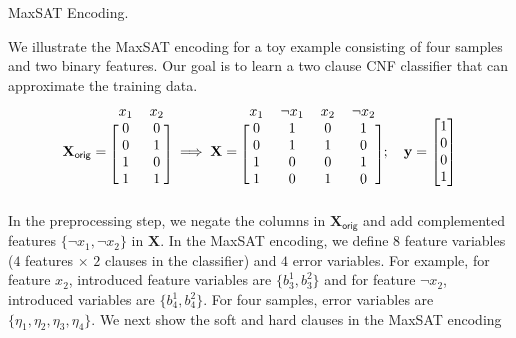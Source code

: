 \begin{example}{MaxSAT Encoding.}
\normalfont

We illustrate the MaxSAT encoding for a toy example consisting of four samples and two binary features. Our goal is to learn a two clause CNF classifier that can approximate the training data. 
\[ 
\mathbf{X}_\mathsf{orig} = 
\begin{blockarray}{cc}
x_1 & x_2 \\
\begin{block}{[cc]}
0 & 0 \\
0 & 1 \\
1 & 0 \\
1 & 1 \\
\end{block}
\end{blockarray} \implies 
\mathbf{X} = 
\begin{blockarray}{cccc}
x_1 & \neg x_1 & x_2  & \neg x_2\\
\begin{block}{[cccc]}
0 & 1 & 0 & 1\\
0 & 1 & 1 & 0\\
1 & 0 & 0 & 1\\
1 & 0 & 1 & 0\\
\end{block}
\end{blockarray}; \quad 
\mathbf{y} = 
\begin{bmatrix} 
1 \\ 0 \\ 0 \\ 1
\end{bmatrix}
\]
In the preprocessing step, we negate the columns in $ \mathbf{X}_\mathsf{orig} $ and add complemented features $ \{\neg x_1, \neg x_2\} $ in $ \mathbf{X} $. In the MaxSAT encoding, we define $ 8 $ feature variables ($ 4 $ features $ \times $ $ 2 $ clauses in the classifier) and $ 4 $ error variables. For example, for feature $ x_2 $, introduced feature variables are $ \{b^1_3, b^2_3\} $ and for feature $ \neg x_2 $, introduced variables are $ \{b^1_4, b^2_4\} $. For four samples, error variables are $ \{\eta_1, \eta_2, \eta_3, \eta_4\} $. We next show the soft and hard clauses in the MaxSAT encoding



\end{example}
